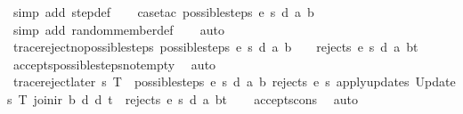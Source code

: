 \begin{isabellebody}
%
\isatagproof
{}\isamarkupfalse%
\ {\isacharparenleft}simp\ add{\isacharcolon}\ step{\isacharunderscore}def{\isacharparenright}\isanewline
\ \ \isamarkupfalse%
\ {\isacharparenleft}case{\isacharunderscore}tac\ {\isachardoublequoteopen}possible{\isacharunderscore}steps\ e\ s\ d\ a\ b{\isachardoublequoteclose}{\isacharparenright}\isanewline
\ \ \ \isamarkupfalse%
\ {\isacharparenleft}simp\ add{\isacharcolon}\ random{\isacharunderscore}member{\isacharunderscore}def{\isacharparenright}\isanewline
\ \ \isamarkupfalse%
\ auto%
\endisatagproof
{\isafoldproof}%
%
\isadelimproof
\isanewline
%
\endisadelimproof
\isanewline
\isanewline
\isanewline
{}\isamarkupfalse%
\ trace{\isacharunderscore}reject{\isacharunderscore}no{\isacharunderscore}possible{\isacharunderscore}steps{\isacharcolon}\ {\isachardoublequoteopen}possible{\isacharunderscore}steps\ e\ s\ d\ a\ b\ {\isacharequal}\ {\isacharbraceleft}{\isacharbar}{\isacharbar}{\isacharbraceright}\ {\isasymLongrightarrow}\ rejects\ e\ s\ d\ {\isacharparenleft}{\isacharparenleft}a{\isacharcomma}\ b{\isacharparenright}{\isacharhash}t{\isacharparenright}{\isachardoublequoteclose}\isanewline
%
\isadelimproof
\ \ %
\endisadelimproof
%
\isatagproof
{}\isamarkupfalse%
\ accepts{\isacharunderscore}possible{\isacharunderscore}steps{\isacharunderscore}not{\isacharunderscore}empty\ \isamarkupfalse%
\ auto%
\endisatagproof
{\isafoldproof}%
%
\isadelimproof
\isanewline
%
\endisadelimproof
\isanewline
{}\isamarkupfalse%
\ trace{\isacharunderscore}reject{\isacharunderscore}later{\isacharcolon}\ {\isachardoublequoteopen}{\isasymforall}{\isacharparenleft}s{\isacharprime}{\isacharcomma}\ T{\isacharparenright}\ {\isacharbar}{\isasymin}{\isacharbar}\ possible{\isacharunderscore}steps\ e\ s\ d\ a\ b{\isachardot}\ rejects\ e\ s{\isacharprime}\ {\isacharparenleft}apply{\isacharunderscore}updates\ {\isacharparenleft}Updates\ T{\isacharparenright}\ {\isacharparenleft}join{\isacharunderscore}ir\ b\ d{\isacharparenright}\ d{\isacharparenright}\ t\ {\isasymLongrightarrow}\ rejects\ e\ s\ d\ {\isacharparenleft}{\isacharparenleft}a{\isacharcomma}\ b{\isacharparenright}{\isacharhash}t{\isacharparenright}{\isachardoublequoteclose}\isanewline
%
\isadelimproof
\ \ %
\endisadelimproof
%
\isatagproof
{}\isamarkupfalse%
\ accepts{\isacharunderscore}cons\ \isamarkupfalse%
\ auto%
\endisatagproof
{\isafoldproof}%
%
\isadelimproof
\isanewline
%
\endisadelimproof
\isanewline
{}\isamarkupfalse%

\end{isabellebody}
